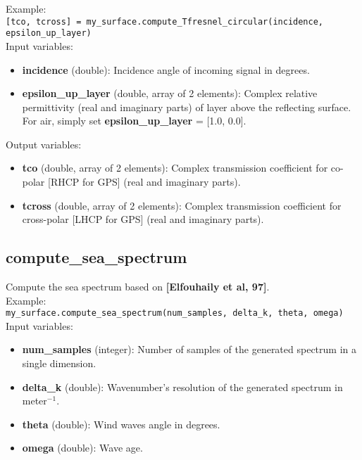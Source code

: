 Example:\\

\texttt{[tco, tcross] = my\_surface.compute\_Tfresnel\_circular(incidence, epsilon\_up\_layer)}\\

Input variables:
\begin{itemize}
\item {\bf incidence} (double): Incidence angle of incoming signal in degrees.
\item {\bf epsilon\_up\_layer} (double, array of 2 elements): Complex relative permittivity (real and imaginary parts) of layer above the reflecting surface. For air, simply set {\bf epsilon\_up\_layer} = [1.0, 0.0].
\end{itemize}

Output variables:
\begin{itemize}
\item {\bf tco} (double, array of 2 elements): Complex transmission coefficient for co-polar [RHCP for GPS] (real and imaginary parts).
\item {\bf tcross} (double, array of 2 elements): Complex transmission coefficient for cross-polar [LHCP for GPS] (real and imaginary parts).
\end{itemize}


\subsection{compute\_sea\_spectrum}

Compute the sea spectrum based on {\bf [Elfouhaily et al, 97]}.\\

Example:\\

\texttt{my\_surface.compute\_sea\_spectrum(num\_samples, delta\_k, theta, omega)}\\

Input variables:
\begin{itemize}
\item {\bf num\_samples} (integer): Number of samples of the generated spectrum in a single dimension.
\item {\bf delta\_k} (double): Wavenumber's resolution of the generated spectrum in meter$^{-1}$.
\item {\bf theta} (double): Wind waves angle in degrees.
\item {\bf omega} (double): Wave age.
\end{itemize}


